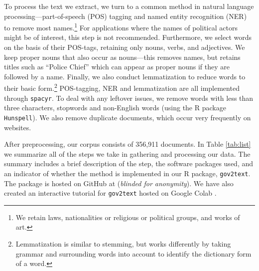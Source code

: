\documentclass[11pt]{article}
\begin{document}
To process the text we extract, we turn to a common method in natural language processing---part-of-speech (POS) tagging and named entity recognition (NER) to remove most names.\footnote{We retain laws, nationalities or religious or political groups, and works of art.} For applications where the names of political actors might be of interest, this step is not recommended. Furthermore, we select words on the basis of their POS-tags, retaining only nouns, verbs, and adjectives. We keep proper nouns that also occur as nouns---this removes names, but retains titles such as ``Police Chief'' which can appear as proper nouns if they are followed by a name. Finally, we also conduct lemmatization to reduce words to their basic form.\footnote{Lemmatization is similar to stemming, but works differently by taking grammar and surrounding words into account to identify the dictionary form of a word. } POS-tagging, NER and lemmatization are all implemented through \texttt{spacyr}. To deal with any leftover issues, we remove words with less than three characters, stopwords and non-English words (using the R package \texttt{Hunspell}).  We also remove duplicate documents, which occur very frequently on websites. %

After preprocessing, our corpus consists of 356,911 documents.  In Table \ref{tab:list} we summarize all of the steps we take in gathering and processing our data. The summary includes a brief description of the step, the software packages used, and an indicator of whether the method is implemented in our R package, \texttt{gov2text}. The package is hosted on GitHub at ({\em blinded for anonymity}). We have also created an interactive tutorial for \texttt{gov2text} hosted on Google Colab \citep{bisong2019google}. 
\end{document}
